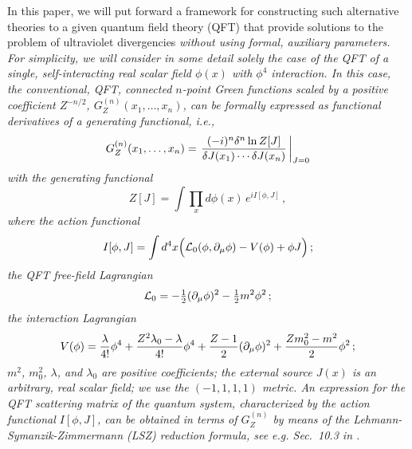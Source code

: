 \documentclass[a4paper,12pt]{article}
\newcommand{\half}{{\textstyle{1\over2}}}
\newcommand{\polje}{\phi}
\newcommand{\akcija}{I}
\newcommand{\Lag}{{\cal L}}
\newcommand{\Lagf}{\Lag_{0}}
\newcommand{\Lagi}{V}
\newcommand{\Gf}{G^{(n)}}
\newcommand{\GfZ}{\Gf_Z}
\begin{document}
In this paper, we will put forward a framework for constructing such alternative theories to a given quantum field theory (QFT) that provide solutions to the problem of ultraviolet divergencies \it without using formal, auxiliary parameters. \rm For simplicity, we will consider in some detail solely the case of the QFT of a single, self-interacting real scalar field $\polje(x)$ with $\polje^4$ interaction. In this case, the conventional, QFT, connected $n$-point Green functions scaled by a positive coefficient $Z^{-n/2}$, $\GfZ(x_1,\ldots, x_n)$, can be formally expressed as functional derivatives of a generating functional, i.e.,
\begin{equation}
  \GfZ(x_1,\ldots, x_n) = \left. { (-i)^{n} \delta^n \ln Z[J] \over\delta J(x_1) \cdots \delta J(x_n) }\, \right|_{J = 0} 
  \label{Greendef}
\end{equation}
with the generating functional
\begin{equation}
   Z[J] = \int \prod_{x} d\polje(x) \, e^{ i \akcija[\polje,J] } \,,
  \label{genfunc}
\end{equation}
where the action functional
\begin{equation}
   \akcija[\polje,J] = \int d^4x \Bigl ( \Lagf(\polje, \partial_\mu \polje) - \Lagi(\polje) + \polje J \Bigr) \,;
   \label{QFTaction}
\end{equation}
the QFT free-field Lagrangian 
\begin{equation}
   \Lagf = - \half (\partial_\mu \polje)^2 - \half m^2 \polje^2 \,;
   \label{QFTfreelagr}
\end{equation}
the interaction Lagrangian
\begin{equation}
   \Lagi(\polje) = {\lambda \over 4!} \polje^4 + {Z^2\lambda_0 -\lambda \over 4!} \polje^4 + {Z - 1\over 2} (\partial_\mu \polje)^2 
               + {Z m_0^2 - m^2\over 2} \polje^2 \,;
   \label{QFTintlagr}
\end{equation}
$m^2$, $m_0^2$, $\lambda$, and $\lambda_0$ are positive coefficients; the external source $J(x)$ is an arbitrary, real scalar field; we use the $(-1, 1, 1, 1)$ metric. An expression for the QFT scattering matrix of the quantum system, characterized by the action functional $\akcija[\polje,J]$, can be obtained in terms of $\GfZ$ by means of the Lehmann-Symanzik-Zimmermann (LSZ) reduction formula, see e.g. Sec.~10.3 in \cite{Weinberg}.
\end{document}
